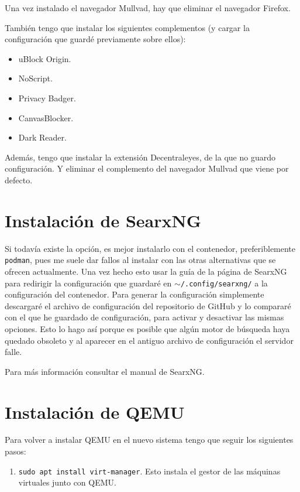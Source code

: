 \documentclass{article}
\begin{document}
    Una vez instalado el navegador Mullvad, hay que eliminar el navegador
    Firefox.

    También tengo que instalar los siguientes complementos (y cargar la
    configuración que guardé previamente sobre ellos):
    \begin{itemize}
    	   \item uBlock Origin.
    	   \item NoScript.
    	   \item Privacy Badger.
    	   \item CanvasBlocker.
    	   \item Dark Reader.
    \end{itemize}
    
    Además, tengo que instalar la extensión Decentraleyes, de la que no guardo
    configuración. Y eliminar el complemento del navegador Mullvad que viene por
    defecto.

    \section{Instalación de SearxNG}
    Si todavía existe la opción, es mejor instalarlo con el contenedor,
    preferiblemente \texttt{podman}, pues me suele dar fallos al instalar con
    las otras alternativas que se ofrecen actualmente. Una vez hecho esto usar
    la guía de la página de SearxNG para redirigir la configuración que guardaré
    en \texttt{$\sim$/.config/searxng/} a la configuración del contenedor. Para
    generar la
    configuración simplemente descargaré el archivo de configuración del
    repositorio de GitHub y lo compararé con el que he guardado de
    configuración, para activar y desactivar las mismas opciones. Esto lo hago
    así porque es posible que algún motor de búsqueda haya quedado obsoleto y al
    aparecer en el antiguo archivo de configuración el servidor falle.

    Para más información consultar el manual de SearxNG.

    \section{Instalación de QEMU}
    Para volver a instalar QEMU en el nuevo sistema tengo que seguir los
    siguientes pasos:

    \begin{enumerate}
    	   \item \texttt{sudo apt install virt-manager}. Esto instala el gestor
		   de las máquinas virtuales junto con QEMU.
    \end{enumerate}
    
\end{document}
